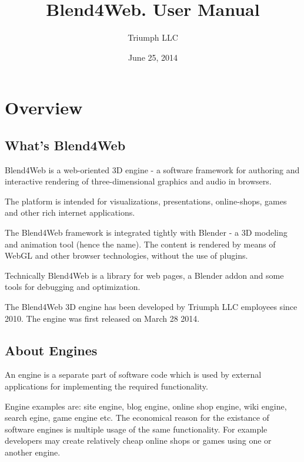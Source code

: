 \documentclass[a4paper,12pt,oneside]{sphinxmanual}
\title{Blend4Web. User Manual}
\date{June 25, 2014}
\author{Triumph LLC}
\begin{document}
\maketitle
\tableofcontents
{}\label{index::doc}



\chapter{Overview}
\label{about:about}\label{about::doc}\label{about:id1}

\section{What's Blend4Web}
\label{about:about-product}\label{about:blend4web}\label{about:index-0}
Blend4Web is a web-oriented 3D engine - a software framework for authoring and interactive rendering of three-dimensional graphics and audio in browsers.

The platform is intended for visualizations, presentations, online-shops, games and other rich internet applications.

The Blend4Web framework is integrated tightly with Blender - a 3D modeling and animation tool (hence the name). The content is rendered by means of WebGL and other browser technologies, without the use of plugins.

Technically Blend4Web is a library for web pages, a Blender addon and some tools for debugging and optimization.

The Blend4Web 3D engine has been developed by Triumph LLC employees since 2010. The engine was first released on March 28 2014.


\section{About Engines}
\label{about:about-engine}\label{about:id2}\label{about:index-1}
An engine is a separate part of software code which is used by external applications for implementing the required functionality.

Engine examples are: site engine, blog engine, online shop engine, wiki engine, search egine, game engine etc. The economical reason for the existance of software engines is multiple usage of the same functionality. For example developers may create relatively cheap online shops or games using one or another engine.
\end{document}
